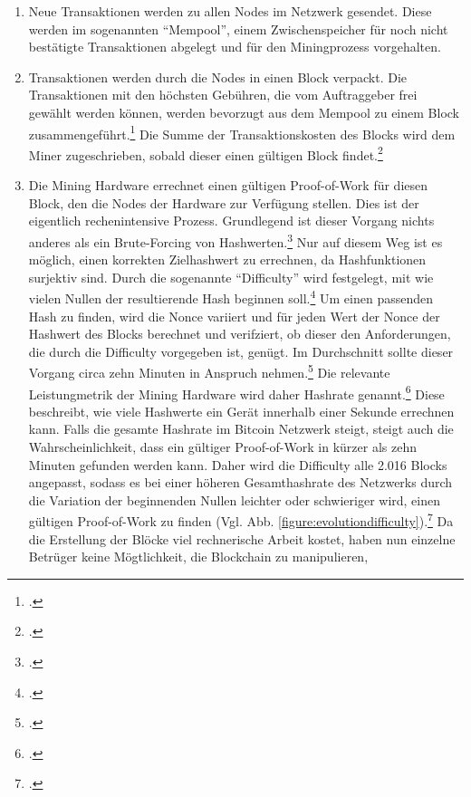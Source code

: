 \begin{enumerate}
    \item Neue Transaktionen werden zu allen Nodes im Netzwerk gesendet. Diese werden im sogenannten "`Mempool"',
    einem Zwischenspeicher für noch nicht bestätigte Transaktionen abgelegt und für den Miningprozess vorgehalten.
    \item Transaktionen werden durch die Nodes in einen Block verpackt. Die Transaktionen mit den höchsten Gebühren,
    die vom Auftraggeber frei gewählt werden können, werden bevorzugt aus dem Mempool zu einem Block
    zusammengeführt.\footcite[Cf.][p. 53]{bhaskar2015bitcoin} Die Summe der Transaktionskosten des Blocks wird dem Miner
    zugeschrieben, sobald dieser einen gültigen Block findet.\footcite[Cf.][p. 4]{nakamoto2008bitcoin}
    \item Die Mining Hardware errechnet einen gültigen Proof-of-Work für diesen Block, den die Nodes der Hardware zur
    Verfügung stellen. Dies ist der eigentlich rechenintensive Prozess. Grundlegend ist dieser Vorgang nichts
    anderes als ein Brute-Forcing von Hashwerten.\footcite[Cf.][p. 747]{mukhopadhyay2016brief} Nur auf diesem Weg ist
    es möglich, einen korrekten Zielhashwert zu errechnen, da Hashfunktionen surjektiv sind. Durch die sogenannte
    "`Difficulty"' wird festgelegt, mit wie vielen Nullen der resultierende Hash beginnen
    soll.\footcite[Cf.][p. 57]{bhaskar2015bitcoin} Um einen passenden Hash zu finden, wird die Nonce variiert und
    für jeden Wert der Nonce der Hashwert des Blocks berechnet und verifziert, ob dieser den Anforderungen, die
    durch die Difficulty vorgegeben ist, genügt. Im Durchschnitt sollte dieser Vorgang circa zehn Minuten in Anspruch
    nehmen.\footcite[Cf.][p. 748]{mukhopadhyay2016brief} Die relevante Leistungmetrik der Mining Hardware wird daher
    Hashrate genannt.\footcite[Cf.][p. 49]{bhaskar2015bitcoin} Diese beschreibt, wie viele Hashwerte ein Gerät innerhalb
    einer Sekunde errechnen kann. Falls die gesamte Hashrate im Bitcoin Netzwerk steigt, steigt auch die
    Wahrscheinlichkeit, dass ein gültiger Proof-of-Work in kürzer als zehn Minuten gefunden werden kann. Daher wird die
    Difficulty alle 2.016 Blocks angepasst, sodass es bei einer höheren Gesamthashrate des Netzwerks durch die Variation
    der beginnenden Nullen leichter oder schwieriger wird, einen gültigen Proof-of-Work zu finden (Vgl.
    Abb. \ref{figure:evolutiondifficulty}).\footcite[Cf.][p. 57]{bhaskar2015bitcoin} Da die Erstellung der Blöcke
    viel rechnerische Arbeit kostet, haben nun einzelne Betrüger keine Mögtlichkeit, die Blockchain zu manipulieren,

\end{enumerate}
